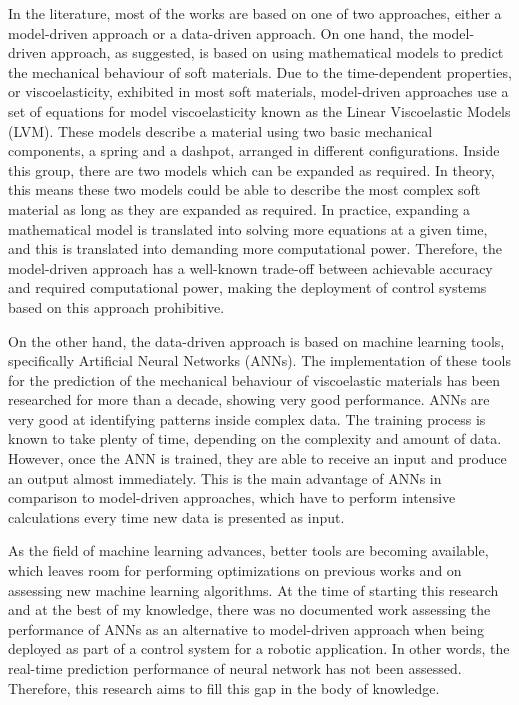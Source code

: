 In the literature, most of the works are based on one of two approaches, either a model-driven approach or a data-driven approach. On one hand, the model-driven approach, as suggested, is based on using mathematical models to predict the mechanical behaviour of soft materials. Due to the time-dependent properties, or viscoelasticity, exhibited in most soft materials, model-driven approaches use a set of equations for model viscoelasticity known as the Linear Viscoelastic Models (LVM). These models describe a material using two basic mechanical components, a spring and a dashpot, arranged in different configurations. Inside this group, there are two models which can be expanded as required. In theory, this means these two models could be able to describe the most complex soft material as long as they are expanded as required. In practice, expanding a mathematical model is translated into solving more equations at a given time, and this is translated into demanding more computational power. Therefore, the model-driven approach has a well-known trade-off between achievable accuracy and required computational power, making the deployment of control systems based on this approach prohibitive. 

On the other hand, the data-driven approach is based on machine learning tools, specifically Artificial Neural Networks (ANNs). The implementation of these tools for the prediction of the mechanical behaviour of viscoelastic materials has been researched for more than a decade, showing very good performance. ANNs are very good at identifying patterns inside complex data. The training process is known to take plenty of time, depending on the complexity and amount of data. However, once the ANN is trained, they are able to receive an input and produce an output almost immediately. This is the main advantage of ANNs in comparison to model-driven approaches, which have to perform intensive calculations every time new data is presented as input.

As the field of machine learning advances, better tools are becoming available, which leaves room for performing optimizations on previous works and on assessing new machine learning algorithms. At the time of starting this research and at the best of my knowledge, there was no documented work assessing the performance of ANNs as an alternative to model-driven approach when being deployed as part of a control system for a robotic application. In other words, the real-time prediction performance of neural network has not been assessed. Therefore, this research aims to fill this gap in the body of knowledge.

